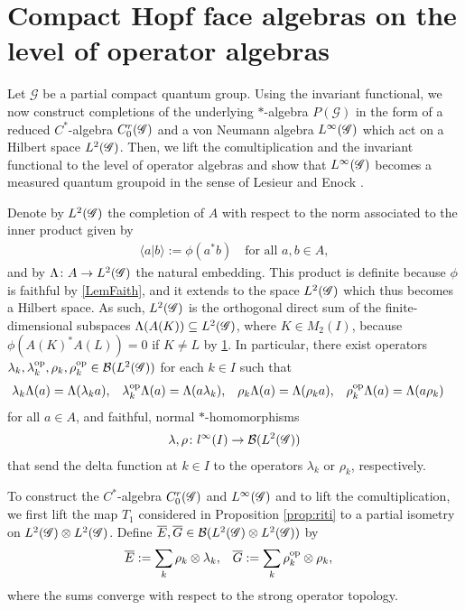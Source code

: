 \section{Compact Hopf face algebras on the level of operator algebras}


Let $\mathscr{G}$ be a partial compact quantum group. Using the
invariant functional, we now construct completions of the underlying
$*$-algebra $P(\mathscr{G})$ in the form of a reduced $C^{*}$-algebra $C^{r}_{0}(\mathscr{G})$
and a von Neumann algebra $L^{\infty}(\mathscr{G})$ which act on a Hilbert space
$L^{2}(\mathscr{G})$. Then, we lift the  comultiplication and the invariant
functional to the level of operator algebras and show that $L^{\infty}(\mathscr{G})$ becomes a measured
quantum groupoid in the sense of Lesieur \cite{} and Enock \cite{}.


Denote by $L^{2}(\mathscr{G})$ the completion of $A$ with respect to the norm
associated to the inner product given by
\begin{align*}
  \langle a|b\rangle :=\phi(a^{*}b) \quad \text{for all } a,b\in A,
\end{align*}
and by $\Lambda \colon A \to L^{2}(\mathscr{G})$ the natural embedding.  This
product is definite because $\phi$ is faithful by \ref{LemFaith}, and
it extends to the space $L^{2}(\mathscr{G})$ which thus becomes a Hilbert space.
As such, $L^{2}(\mathscr{G})$ is the
orthogonal direct sum of the finite-dimensional subspaces
$\Lambda(A(K)) \subseteq L^{2}(\mathscr{G})$, where $K\in M_{2}(I)$, because
$\phi(A(K)^{*}A(L)) = 0$ if $K\neq L$ by \ref{}.  In particular, there
exist  operators
$\lambda_{k},\lambda_{k}^{\operatorname{\mathrm{op}}},\rho_{k},\rho_{k}^{\operatorname{\mathrm{op}}}\in {\cal
  B}(L^{2}(\mathscr{G}))$ for each $k\in I$ such that
\begin{align*}
  \lambda_{k}\Lambda(a)&= \Lambda(\lambda_{k} a), &
  \lambda^{\operatorname{\mathrm{op}}}_{k}\Lambda(a) &= \Lambda(a\lambda_{k}), &
  \rho_{k}\Lambda(a) &= \Lambda(\rho_{k}a), &
  \rho_{k}^{\operatorname{\mathrm{op}}}\Lambda(a) &= \Lambda(a\rho_{k})
\end{align*}
for all $a\in A$, and faithful, normal $*$-homomorphisms
\begin{align} \label{eq:vn-lambda-rho}
  \lambda,\rho \colon l^{\infty}(I) \to
  {\cal B}(L^{2}(\mathscr{G}))
\end{align}
that send the delta function at
$k\in I$ to the operators $\lambda_{k}$ or $\rho_{k}$, respectively. 

To construct the $C^{*}$-algebra $C^{r}_{0}(\mathscr{G})$ and $L^{\infty}(\mathscr{G})$ and to lift the
comultiplication, we first lift the map $T_{1}$ considered in
Proposition \ref{prop:riti} to a partial isometry on $L^{2}(\mathscr{G}) \otimes
L^{2}(\mathscr{G})$.  Define $\overline{E},\overline{G} \in {\cal B}(L^{2}(\mathscr{G}) \otimes
L^{2}(\mathscr{G}))$ by
\begin{align*}
  \overline{E} &:=\sum_{k} \rho_{k} \otimes \lambda_{k}, & 
  \overline{G} &:= \sum_{k} \rho_{k}^{\operatorname{\mathrm{op}}} \otimes \rho_{k},
\end{align*}
where the sums converge with respect to the strong operator
topology.

